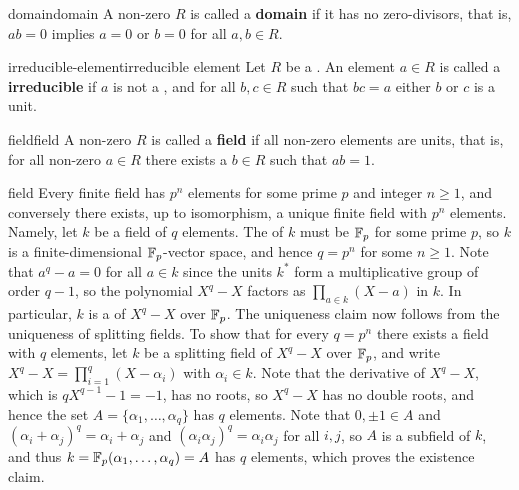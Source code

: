 \begin{topic}{domain}{domain}
    A non-zero  $R$ is called a \textbf{domain} if it has no zero-divisors, that is, $ab = 0$ implies $a = 0$ or $b = 0$ for all $a, b \in R$.
\end{topic}

\begin{topic}{irreducible-element}{irreducible element}
    Let $R$ be a . An element $a \in R$ is called a \textbf{irreducible} if $a$ is not a , and for all $b, c \in R$ such that $bc = a$ either $b$ or $c$ is a unit.
\end{topic}

\begin{topic}{field}{field}
    A non-zero  $R$ is called a \textbf{field} if all non-zero elements are units, that is, for all non-zero $a \in R$ there exists a $b \in R$ such that $ab = 1$. 
\end{topic}

\begin{example}{field}
    Every finite field has $p^n$ elements for some prime $p$ and integer $n \ge 1$, and conversely there exists, up to isomorphism, a unique finite field with $p^n$ elements.
    Namely, let $k$ be a field of $q$ elements. The  of $k$ must be $\mathbb{F}_p$ for some prime $p$, so $k$ is a finite-dimensional $\mathbb{F}_p$-vector space, and hence $q = p^n$ for some $n \ge 1$. Note that $a^q - a = 0$ for all $a \in k$ since the units $k^*$ form a multiplicative group of order $q - 1$, so the polynomial $X^q - X$ factors as $\prod_{a \in k} (X - a)$ in $k$. In particular, $k$ is a  of $X^q - X$ over $\mathbb{F}_p$. The uniqueness claim now follows from the uniqueness of splitting fields.
    To show that for every $q = p^n$ there exists a field with $q$ elements, let $k$ be a splitting field of $X^q - X$ over $\mathbb{F}_p$, and write $X^q - X = \prod_{i = 1}^{q} (X - \alpha_i)$ with $\alpha_i \in k$. Note that the derivative of $X^q - X$, which is $qX^{q - 1} - 1 = -1$, has no roots, so $X^q - X$ has no double roots, and hence the set $A = \{ \alpha_1, \ldots, \alpha_q \}$ has $q$ elements. Note that $0, \pm 1 \in A$ and $(\alpha_i + \alpha_j)^q = \alpha_i + \alpha_j$ and $(\alpha_i \alpha_j)^q = \alpha_i \alpha_j$ for all $i, j$, so $A$ is a subfield of $k$, and thus $k = \mathbb{F}_p(\alpha_1, \ldots, \alpha_q) = A$ has $q$ elements, which proves the existence claim.
\end{example}

